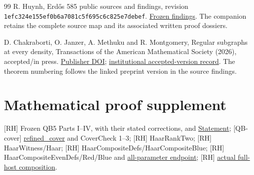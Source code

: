 \documentclass[smallextended]{svjour3}
\begin{document}
\begin{thebibliography}{99}
R. Huynh, Erdős 585 public sources and findings, revision
\texttt{1efc324e155ef0b6a7081c5f695c6c825e7debef}.
\href{https://github.com/roberthuynh/erdos-585/blob/1efc324e155ef0b6a7081c5f695c6c825e7debef/findings/FINDINGS.md}{Frozen
findings}. The companion retains the complete source map and its
associated written proof dossiers.

D. Chakraborti, O. Janzer, A. Methuku and R. Montgomery,
Regular subgraphs at every density, Transactions of the American
Mathematical Society (2026), accepted/in press.
\href{https://doi.org/10.1090/tran/9694}{Publisher DOI};
\href{https://wrap.warwick.ac.uk/id/eprint/194663/}{institutional
accepted-version record}. The theorem numbering follows the linked
preprint version in the source findings.
\end{thebibliography}

\section*{Mathematical proof supplement}
{[}RH{]} Frozen QB5 Parts I--IV, with their stated corrections, and
\href{https://github.com/roberthuynh/erdos-585/blob/1efc324e155ef0b6a7081c5f695c6c825e7debef/Openmath/Proofs/QB5/Statement.lean\#L42}{Statement};
{[}QB-cover{]}
\href{https://github.com/roberthuynh/erdos-585/blob/1efc324e155ef0b6a7081c5f695c6c825e7debef/Openmath/Proofs/QB5/Cover.lean\#L800}{refined\_cover}
and CoverCheck 1--3; {[}RH{]} HaarRankTwo; {[}RH{]} HaarWitness/Haar;
{[}RH{]} HaarCompositeDefs/HaarCompositeBlue; {[}RH{]}
HaarCompositeEvenDefs/Red/Blue and
\href{https://github.com/roberthuynh/erdos-585/blob/1efc324e155ef0b6a7081c5f695c6c825e7debef/findings/supplement/lean/Openmath/Proofs/HaarCompositeEven.lean\#L441}{all-parameter
endpoint}; {[}RH{]}
\href{https://github.com/alejandrozu/openmath-2026-judging/blob/70c5ec3107658182f22c207d4c50f53f9cb3e602/robert-review-2026-10-07/lean/CycleComposition.lean\#L171}{actual
full-host composition}.
\end{document}
